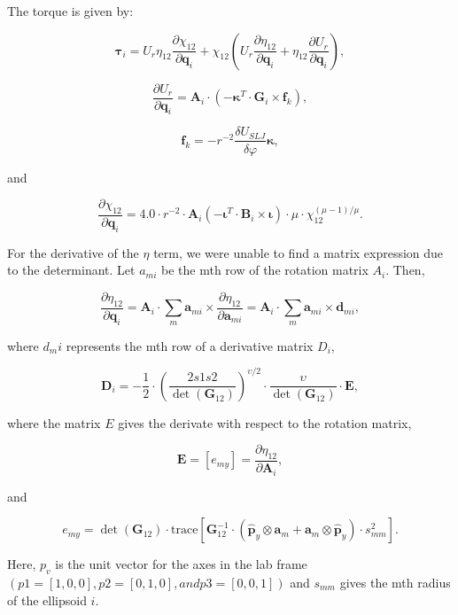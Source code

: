The torque is given by:

$$ \mathbf{\tau}_i = U_r \eta_{12} \frac{ \partial \chi_{12} }{
\partial \mathbf{q}_i } + \chi_{12} ( U_r \frac{ \partial \eta_{12} }{
\partial \mathbf{q}_i } + \eta_{12} \frac{ \partial U_r }{ \partial
\mathbf{q}_i } ), $$

$$ \frac{ \partial U_r }{ \partial \mathbf{q}_i } = \mathbf{A}_i \cdot
(- \mathbf{\kappa}^T \cdot \mathbf{G}_i \times \mathbf{f}_k ), $$

$$ \mathbf{f}_k = - r^{-2} \frac{ \delta U_{SLJ} }{ \delta \varphi }
\mathbf{\kappa}, $$

and

$$ \frac{ \partial \chi_{12} }{ \partial \mathbf{q}_i } = 4.0 \cdot
r^{-2} \cdot \mathbf{A}_i (- \mathbf{\iota}^T \cdot \mathbf{B}_i
\times \mathbf{\iota} ) \cdot \mu \cdot \chi_{12}^{ ( \mu -1 ) / \mu}. $$

For the derivative of the $\eta$ term, we were unable to find a matrix
expression due to the determinant. Let $a_{mi}$ be the mth row of the
rotation matrix $A_i$. Then,

$$ \frac{ \partial \eta_{12} }{ \partial \mathbf{q}_i } = \mathbf{A}_i
\cdot \sum_m \mathbf{a}_{mi} \times \frac{ \partial \eta_{12} }{
\partial \mathbf{a}_{mi} } = \mathbf{A}_i \cdot \sum_m \mathbf{a}_{mi}
\times \mathbf{d}_{mi}, $$

where $d_mi$ represents the mth row of a derivative matrix $D_i$,

$$ \mathbf{D}_i = - \frac{1}{2} \cdot ( \frac{2s1s2}{\det (
\mathbf{G}_{12} ) } )^{ \upsilon / 2 } \cdot {\frac{\upsilon}{\det (
\mathbf{G}_{12} ) }} \cdot \mathbf{E}, $$

where the matrix $E$ gives the derivate with respect to the rotation
matrix,

$$ \mathbf{E} = [ e_{my} ] = \frac{ \partial \eta_{12} }{ \partial
\mathbf{A}_i }, $$

and

$$ e_{my} = \det ( \mathbf{G}_{12} ) \cdot \mbox{trace} [
\mathbf{G}_{12}^{-1} \cdot ( \hat{\mathbf{p}}_y \otimes \mathbf{a}_m +
\mathbf{a}_m \otimes \hat{\mathbf{p}}_y ) \cdot s_{mm}^2 ]. $$

Here, $p_v$ is the unit vector for the axes in the lab frame $(p1=[1, 0,
0], p2=[0, 1, 0], and p3=[0, 0, 1])$ and $s_{mm}$ gives the mth radius of
the ellipsoid $i$.


